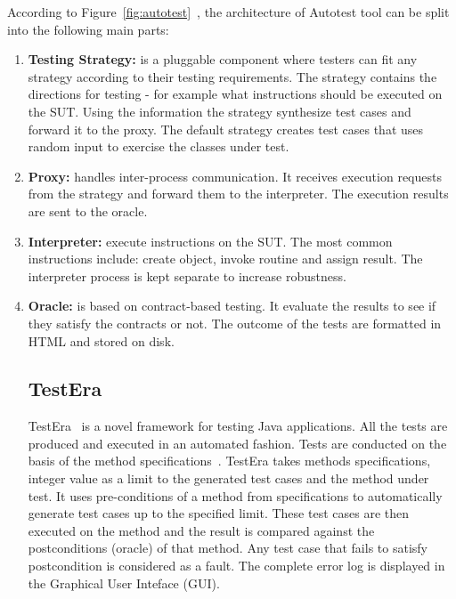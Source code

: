 \noindent According to Figure~\ref{fig:autotest}~\cite{Leitner2007}, the architecture of Autotest tool can be split into the following main parts:
\begin{enumerate}
\item \textbf{Testing Strategy:} is a pluggable component where testers can fit any strategy according to their testing requirements. The strategy contains the directions for testing - for example what instructions should be executed on the SUT. Using the information the strategy synthesize test cases and forward it to the proxy. The default strategy creates test cases that uses random input to exercise the classes under test.
\item \textbf{Proxy:} handles inter-process communication. It receives execution requests from the strategy and forward them to the interpreter. The execution results are sent to the oracle.
\item \textbf{Interpreter:} execute instructions on the SUT. The most common instructions include: create object, invoke routine and assign result. The interpreter process is kept separate to increase robustness.
\item \textbf{Oracle:} is based on contract-based testing. It evaluate the results to see if they satisfy the contracts or not. The outcome of the tests are formatted in HTML and stored on disk.


\subsection{TestEra}
TestEra~\cite{Khurshid2004} is a novel framework for testing Java applications. All the tests are produced and executed in an automated fashion. Tests are conducted on the basis of the method specifications~\cite{Chang1999}. TestEra takes methods specifications, integer value as a limit to the generated test cases and the method under test. It uses pre-conditions of a method from specifications to automatically generate test cases up to the specified limit. These test cases are then executed on the method and the result is compared against the postconditions (oracle) of that method. Any test case that fails to satisfy postcondition is considered as a fault. The complete error log is displayed in the Graphical User Inteface (GUI).


\end{enumerate}
